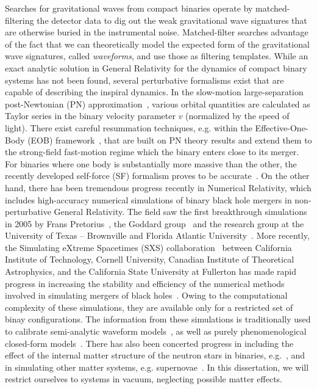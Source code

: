 Searches for gravitational waves from compact binaries operate by 
matched-filtering the detector data to dig out the weak gravitational wave
signatures that are otherwise buried in the instrumental noise. Matched-filter
searches 
advantage of the fact that we can theoretically model the expected form of the 
gravitational wave signatures, called \textit{waveforms}, and use those 
as filtering templates. While an exact analytic solution in General Relativity
for the dynamics of compact binary systems has not been found, several perturbative
formalisms exist that are capable of describing the inspiral dynamics.
In the slow-motion large-separation post-Newtonian (PN) 
approximation~\cite{PNtheoryLivingReviewBlanchet},
various orbital quantities are calculated as Taylor series in the binary 
velocity parameter $v$ (normalized by the speed of light). 
There exist careful resummation techniques, e.g. within the Effective-One-Body
(EOB) framework~\cite{EOBOriginalBuonannoDamour}, 
that are built on PN theory results and extend them to the
strong-field fast-motion regime which the binary enters close to its merger.
For binaries where one body is substantially more massive than the other, 
the recently developed self-force (SF) formalism proves to be 
accurate~\cite{grallaI,grallaII}. 
On the other hand, there has been tremendous progress recently in Numerical
Relativity, which includes high-accuracy numerical simulations of binary black
hole mergers in non-perturbative General Relativity. The field saw the first
breakthrough simulations in 2005 by Frans Pretorius~\cite{Pretorius2005,
Pretorius2006}, the Goddard group~\cite{Campanelli:2005dd} and the research
group at the University of Texas -- Brownville and Florida Atlantic 
University~\cite{Campanelli:2005dd}. More recently, the Simulating eXtreme
Spacetimes (SXS) collaboration~\cite{SXSWebsite} between California Institute
of Technology, Cornell University, Canadian Institute of Theoretical 
Astrophysics, and the California State University at Fullerton has made rapid
progress in increasing the stability and efficiency of the numerical 
methods involved in simulating mergers of black holes~\cite{Mroue:2013xna}.
Owing to the computational complexity of these simulations, they are available 
only for a restricted set of binay configurations. 
The information from these simulations is traditionally used to calibrate
semi-analytic waveform models~\cite{BuonannoEOBv2Main}, as well as purely
phenomenological closed-form models~\cite{Santamaria:2010yb}. 
There has also been concerted progress in including the effect of the 
internal matter structure of the neutron stars in binaries, 
e.g.~\cite{Deaton:2013sla}, and in simulating other matter systems,
e.g. supernovae~\cite{Mosta:2014jaa}.
In this dissertation, we will restrict ourselves to systems in vacuum, 
neglecting possible matter effects. 

